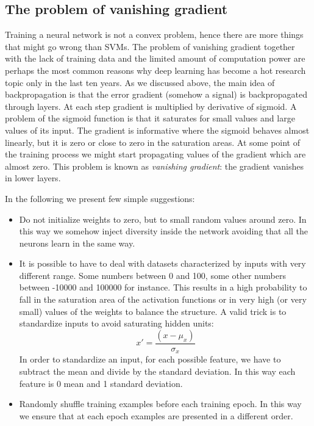 \subsection{The problem of vanishing gradient}
Training a neural network is not a convex problem, hence there are more things that might go wrong than SVMs. The problem of vanishing gradient together with the lack of training data and the limited amount of computation power are perhaps the most common reasons why deep learning has become a hot research topic only in the last ten years. As we discussed above, the main idea of backpropagation is that the error gradient (somehow a signal) is backpropagated through layers. At each step gradient is multiplied by derivative of sigmoid. A problem of the sigmoid function is that it saturates for small values and large values of its input. The gradient is informative where the sigmoid behaves almost linearly, but it is zero or close to zero in the saturation areas. At some point of the training process we might start propagating values of the gradient which are almost zero. This problem is known as \textit{vanishing gradient}: the gradient vanishes in lower layers. \newline

In the following we present few simple suggestions:
\begin{itemize}
    \item Do not initialize weights to zero, but to small random values around zero. In this way we somehow inject diversity inside the network avoiding that all the neurons learn in the same way.
    
    \item It is possible to have to deal with datasets characterized by inputs with very different range. Some numbers between 0 and 100, some other numbers between -10000 and 100000 for instance. This results in a high probability to fall in the saturation area of the activation functions or in very high (or very small) values of the weights to balance the structure. A valid trick is to standardize inputs to avoid saturating hidden units:
    $$x' = \frac{(x - \mu_x)}{\sigma_x}$$
    In order to standardize an input, for each possible feature, we have to subtract the mean and divide by the standard deviation. In this way each feature is 0 mean and 1 standard deviation.
    
    
    \item Randomly shuffle training examples before each training epoch. In this way we ensure that at each epoch examples are presented in a different order.
\end{itemize}

